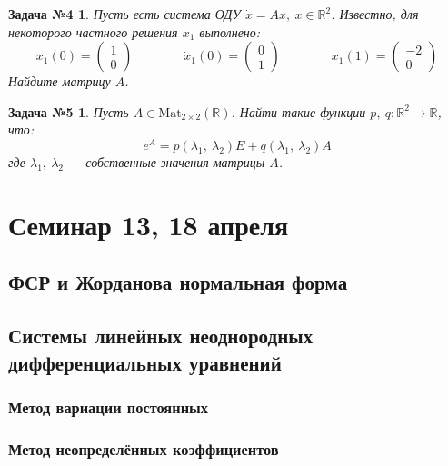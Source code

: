 \documentclass[a4paper,12pt]{article}
\newtheorem*{task4}{Задача №4}
\newtheorem*{task5}{Задача №5}
\newcommand{\Mat}{\mathrm{Mat}}
\newcommand{\R}{\mathbb{R}}
\newcommand{\dx}{\dot{x}}
\renewcommand{\to}{\longrightarrow}
\begin{document}
\begin{task4}
	Пусть есть система ОДУ $\dx = Ax,\ x\in \R^2$.
	Известно, для некоторого частного решения $x_1$ выполнено:
	\[x_1(0) = \begin{pmatrix} 1 \\ 0 \end{pmatrix}\qquad \qquad \dx_1(0) = \begin{pmatrix} 0 \\ 1 \end{pmatrix} \qquad \qquad x_1(1) = \begin{pmatrix} -2 \\ 0 \end{pmatrix}\]
	Найдите матрицу $A$.
\end{task4}
%

\begin{task5}
	Пусть $A \in \Mat_{2\times2}(\R)$. 
	Найти такие функции $p,\ q : \R^2 \to \R$, что:
	\[e^A = p(\lambda_1,\ \lambda_2)E + q(\lambda_1,\ \lambda_2)A\]
	где $\lambda_1,\ \lambda_2$ --- собственные значения матрицы $A$.
\end{task5}
%

\newpage
\section{Семинар 13, 18 апреля}

\subsection{ФСР и Жорданова нормальная форма}

\subsection{Системы линейных неоднородных дифференциальных уравнений}

\subsubsection{Метод вариации постоянных}

\subsubsection{Метод неопределённых коэффициентов}
\end{document}

